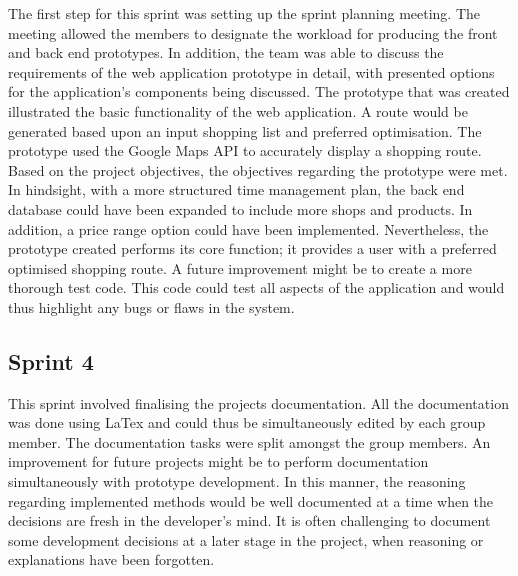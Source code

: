 \documentclass[10pt,twocolumn]{witseiepaper}
\begin{document}
		The first step for this sprint was setting up the sprint planning meeting. The meeting allowed the members to designate the workload for producing the front and back end prototypes. In addition, the team was able to discuss the requirements of the web application prototype in detail, with presented options for the application's components being discussed. The prototype that was created illustrated the basic functionality of the web application. A route would be generated based upon an input shopping list and preferred optimisation.  The prototype used the Google Maps API to accurately display a shopping route. Based on the project objectives, the objectives regarding the prototype were met. In hindsight, with a more structured time management plan, the back end database could have been expanded to include more shops and products. In addition, a price range option could have been implemented. Nevertheless, the prototype created performs its core function; it provides a user with a preferred optimised shopping route. A future improvement might be to create a more thorough test code. This code could test all aspects of the application and would thus highlight any bugs or flaws in the system. 
		
		\subsection{Sprint 4}	
		
		This sprint involved finalising the projects documentation. All the documentation was done using LaTex and could thus be simultaneously edited by each group member. The documentation tasks were split amongst the group members. An improvement for future projects might be to perform documentation simultaneously with prototype development. In this manner, the reasoning regarding implemented methods would be well documented at a time when the decisions are fresh in the developer's mind. It is often challenging to document some development decisions at a later stage in the project, when reasoning or explanations have been forgotten. 

\newpage
\end{document}
